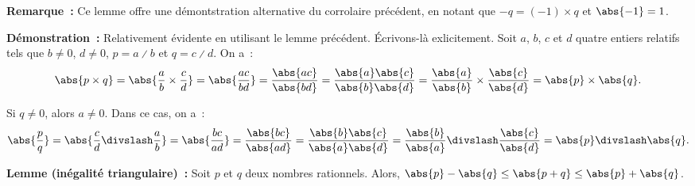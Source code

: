 \medskip

\noindent\textbf{Remarque :} Ce lemme offre une démontstration alternative du corrolaire précédent, en notant que $-q = (-1) \times q$ et $\abs{-1} = 1$.

\medskip

\noindent\textbf{Démonstration :} Relativement évidente en utilisant le lemme précédent. 
    Écrivons-là exlicitement.
    Soit $a$, $b$, $c$ et $d$ quatre entiers relatifs tels que $b \neq 0$, $d \neq 0$, $p = a \divslash b$ et $q = c \divslash d$.
    On a : 
    \begin{equation*}
        \abs{p \times q} 
        = \abs{\frac{a}{b} \times \frac{c}{d}}
        = \abs{\frac{a c}{b d}}
        = \frac{\abs{a c}}{\abs{b d}}
        = \frac{\abs{a} \abs{c}}{\abs{b} \abs{d}}
        = \frac{\abs{a}}{\abs{b}} \times \frac{\abs{c}}{\abs{d}}
        = \abs{p} \times \abs{q} .
    \end{equation*}

    Si $q \neq 0$, alors $a \neq 0$. 
    Dans ce cas, on a :
    \begin{equation*}
        \abs{\frac{p}{q}} 
        = \abs{\frac{c}{d} \divslash \frac{a}{b}}
        = \abs{\frac{b c}{a d}}
        = \frac{\abs{b c}}{\abs{a d}}
        = \frac{\abs{b} \abs{c}}{\abs{a} \abs{d}}
        = \frac{\abs{b}}{\abs{a}} \divslash \frac{\abs{c}}{\abs{d}}
        = \abs{p} \divslash \abs{q} .
    \end{equation*}
    
    \done

\medskip

\noindent\textbf{Lemme (inégalité triangulaire) :} Soit $p$ et $q$ deux nombres rationnels. 
    Alors, $\abs{p} - \abs{q} \leq \abs{p + q} \leq \abs{p} + \abs{q}$.

\medskip

